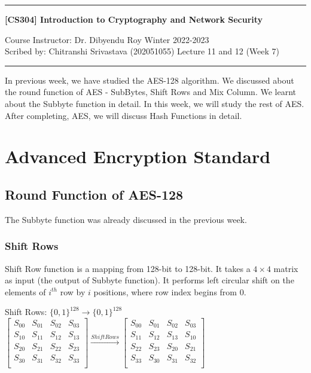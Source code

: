 \documentclass[11pt]{article}
\begin{document}
\noindent
\rule{\textwidth}{1pt}
\begin{center}
{\bf [CS304] Introduction to Cryptography and Network Security}
\end{center}
Course Instructor: Dr. Dibyendu Roy \hfill Winter 2022-2023\\
Scribed by: Chitranshi Srivastava (202051055) \hfill Lecture 11 and 12 (Week 7)
\\
\rule{\textwidth}{1pt}

In previous week, we have studied the AES-128 algorithm. We discussed about the round function of AES - SubBytes, Shift Rows and Mix Column. We learnt about the Subbyte function in detail. In this week, we will study the rest of AES. After completing, AES, we will discuss Hash Functions in detail.

\section{Advanced Encryption Standard}
\subsection{Round Function of AES-128}
The Subbyte function was already discussed in the previous week.

\subsubsection{Shift Rows}
Shift Row function is a mapping from 128-bit to 128-bit. It takes a $4 \times 4$ matrix as input (the output of Subbyte function). It performs left circular shift on the elements of $i^{th}$ row by $i$ positions, where row index begins from 0.
\begin{center}
    Shift Rows: $\{0, 1\}^{128} \rightarrow \{0, 1\}^{128}$\\
    \vspace{1mm}
    $
    \begin{bmatrix}
        S_{00} & S_{01} & S_{02} & S_{03}\\
        S_{10} & S_{11} & S_{12} & S_{13}\\
        S_{20} & S_{21} & S_{22} & S_{23}\\
        S_{30} & S_{31} & S_{32} & S_{33}\\
    \end{bmatrix}
    \xrightarrow{Shift Rows}
    \begin{bmatrix}
        S_{00} & S_{01} & S_{02} & S_{03}\\
        S_{11} & S_{12} & S_{13} & S_{10}\\
        S_{22} & S_{23} & S_{20} & S_{21}\\
        S_{33} & S_{30} & S_{31} & S_{32}\\
    \end{bmatrix}
    $
\end{center}
\end{document}
